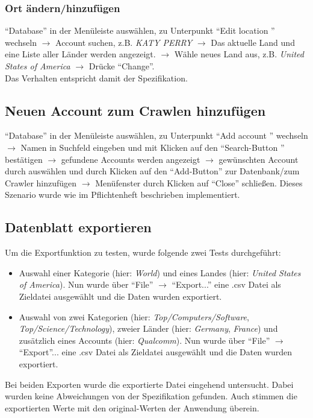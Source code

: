 \subsubsection{Ort ändern/hinzufügen}
"`Database"' in der Menüleiste auswählen, zu Unterpunkt "`Edit location "' wechseln $\to$ Account suchen, z.B. \textit{KATY PERRY} $\to$ Das aktuelle Land und eine Liste aller Länder werden angezeigt. $\to$ Wähle neues Land aus, z.B. \textit{United States of America} $\to$ Drücke "`Change"'.\\
Das Verhalten entspricht damit der Spezifikation.

\subsection{Neuen Account zum Crawlen hinzufügen} \label{sec:AddNewAccount}
"`Database"' in der Menüleiste auswählen, zu Unterpunkt "`Add account "' wechseln $\to$ Namen in Suchfeld eingeben und mit Klicken auf den "`Search-Button "' bestätigen $\to $ gefundene Accounts werden angezeigt $\to$ gewünschten Account durch auswählen und durch Klicken auf den "`Add-Button"' zur Datenbank/zum Crawler hinzufügen $\to$ Menüfenster durch Klicken auf "`Close"' schließen.
Dieses Szenario wurde wie im Pflichtenheft beschrieben implementiert.

\subsection{Datenblatt exportieren}
Um die Exportfunktion zu testen, wurde folgende zwei Tests durchgeführt:
\begin{itemize}
	\item Auswahl einer Kategorie (hier: \textit{World}) und eines Landes (hier: \textit{United States of America}). Nun wurde über "`File"' $\to$ "`Export..."' eine .csv Datei als Zieldatei ausgewählt und die Daten wurden exportiert.
	\item Auswahl von zwei Kategorien (hier: \textit{Top/Computers/Software}, \textit{Top/Science/Technology}), zweier Länder (hier: \textit{Germany}, \textit{France}) und zusätzlich eines Accounts (hier: \textit{Qualcomm}). Nun wurde über "`File"' $\to$ "`Export"'... eine .csv Datei als Zieldatei ausgewählt und die Daten wurden exportiert.
\end{itemize}
Bei beiden Exporten wurde die exportierte Datei eingehend untersucht. Dabei wurden keine Abweichungen von der Spezifikation gefunden. Auch stimmen die exportierten Werte mit den original-Werten der Anwendung überein.